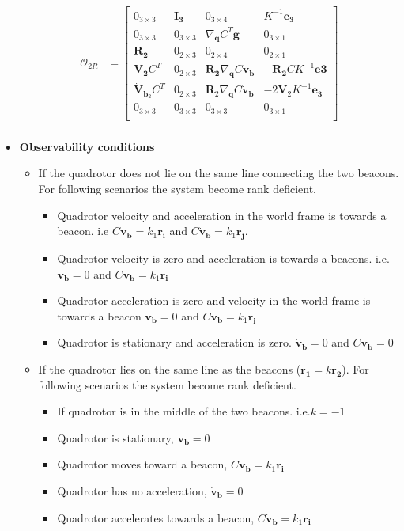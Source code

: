 \documentclass[]{article}
\begin{document}
\begin{itemize}
	\begin{align*}
	\mathcal{O}_{2R} &= \begin{bmatrix}
	0_{3\times 3}& \bm{I_3} & 0_{3\times 4}& K^{-1}\bm{e_3}\\
	0_{3\times 3}& 0_{3\times 3}& \nabla_{\bm{q}} C^T\bm{g}& 0_{3\times 1}\\
	\bm{R_2} & 0_{2\times 3} & 0_{2\times 4} & 0_{2\times 1}\\
	\bm{V_2} C^T & 0_{2\times 3} & \bm{R_2}\nabla_{\bm{q}} C\bm{v_b} & -\bm{R_2}CK^{-1}\bm{e3}\\
	\bm{\dot{V}}_{\bm{b}_2} C^T & 0_{2\times 3} & \bm{R}_2\nabla_{\bm{q}} C\bm{\dot{v}_b} & -2\bm{V}_2K^{-1}\bm{e_3}\\
	0_{3\times 3}& 0_{3\times 3}& 0_{3\times 3}& 0_{3\times 1}\\
	\end{bmatrix}\\
	\end{align*}
	\item \textbf{Observability conditions}
	\begin{itemize}
		\item If the quadrotor does not lie on the same line connecting the two beacons. For following scenarios the system become rank deficient.
		\begin{itemize}
			\item Quadrotor velocity and acceleration in the world frame is towards a beacon. i.e $C\bm{v_b} = k_1 \bm{r_i}$ and  $C\bm{\dot{v}_b} = k_1 \bm{r_j}$.
			\item Quadrotor velocity is zero and acceleration is towards a beacons. i.e. $\bm{v_b} = 0$ and $C\bm{\dot{v}_b} = k_1 \bm{r_i}$
			\item Quadrotor acceleration is zero and velocity in the world frame is towards a beacon $\bm{\dot{v}_b} = 0$ and $C\bm{v_b} = k_1 \bm{r_i}$
			\item Quadrotor is stationary and acceleration is zero.  $\bm{\dot{v}_b} = 0$ and $C\bm{v_b} = 0$
		\end{itemize}
		\item If the quadrotor lies on the same line as the beacons ($\bm{r_1} = k\bm{r_2}$). For following scenarios the system become rank deficient.
		\begin{itemize}
			\item If quadrotor is in the middle of the two beacons. i.e.$k = -1$
			\item Quadrotor is stationary, $\bm{v_b} = 0$
			\item Quadrotor moves toward a beacon,  $C\bm{v_b} = k_1\bm{r_i}$
			\item Quadrotor has no acceleration, $\bm{\dot{v}_b} = 0$
			\item Quadrotor accelerates towards a beacon, $C\bm{\dot{v}_b} = k_1 \bm{r_i}$
		\end{itemize}
	\end{itemize}
	
\end{itemize}
\end{document}
